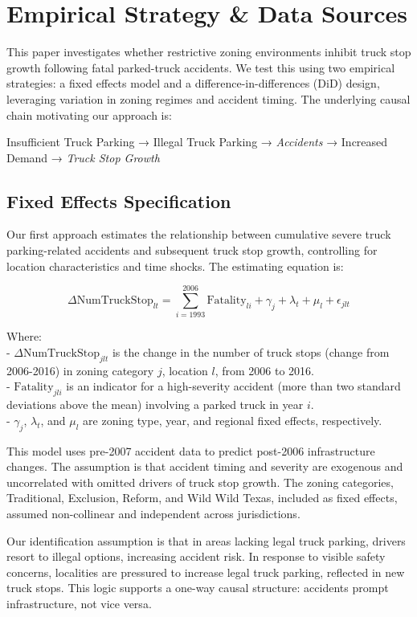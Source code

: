 \documentclass[
  12pt]{article}
\begin{document}
\section{Empirical Strategy \& Data
Sources}\label{empirical-strategy-data-sources}

This paper investigates whether restrictive zoning environments inhibit
truck stop growth following fatal parked-truck accidents. We test this
using two empirical strategies: a fixed effects model and a
difference-in-differences (DiD) design, leveraging variation in zoning
regimes and accident timing. The underlying causal chain motivating our
approach is:

Insufficient Truck Parking → Illegal Truck Parking → \emph{Accidents} →
Increased Demand → \emph{Truck Stop Growth}

\subsection{Fixed Effects
Specification}\label{fixed-effects-specification}

Our first approach estimates the relationship between cumulative severe
truck parking-related accidents and subsequent truck stop growth,
controlling for location characteristics and time shocks. The estimating
equation is:

\[
\Delta \text{NumTruckStop}_{lt} = \sum_{i=1993}^{2006} \text{Fatality}_{li} + \gamma_j + \lambda_t + \mu_l + \epsilon_{jlt}
\]

Where:\\
- \(\Delta \text{NumTruckStop}_{jlt}\) is the change in the number of
truck stops (change from 2006-2016) in zoning category \(j\), location
\(l\), from 2006 to 2016.\\
- \(\text{Fatality}_{jli}\) is an indicator for a high-severity accident
(more than two standard deviations above the mean) involving a parked
truck in year \(i\).\\
- \(\gamma_j\), \(\lambda_t\), and \(\mu_l\) are zoning type, year, and
regional fixed effects, respectively.

This model uses pre-2007 accident data to predict post-2006
infrastructure changes. The assumption is that accident timing and
severity are exogenous and uncorrelated with omitted drivers of truck
stop growth. The zoning categories, Traditional, Exclusion, Reform, and
Wild Wild Texas, included as fixed effects, assumed non-collinear and
independent across jurisdictions.

Our identification assumption is that in areas lacking legal truck
parking, drivers resort to illegal options, increasing accident risk. In
response to visible safety concerns, localities are pressured to
increase legal truck parking, reflected in new truck stops. This logic
supports a one-way causal structure: accidents prompt infrastructure,
not vice versa.
\end{document}
